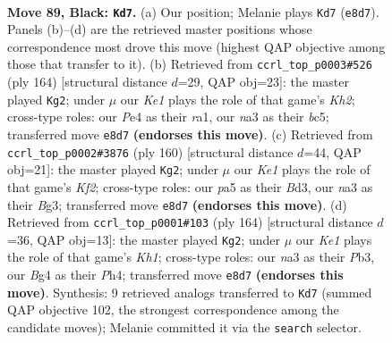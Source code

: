 \documentclass[11pt]{article}
\begin{document}
\clearpage

\begin{figure}[p]\centering
\begin{subfigure}{0.46\textwidth}\centering
\resizebox{\linewidth}{!}{%
\newchessgame
\chessboard[
  setfen={2n1k1K1/2P5/p7/P4p1p/4pBb1/Nr4P1/8/R7 b - - 85 89},
  showmover=false,
  pgfstyle=straightmove, color=movearrow, markmove={e8-d7}
]}
\caption{}
\end{subfigure}\hfill
\begin{subfigure}{0.46\textwidth}\centering
\resizebox{\linewidth}{!}{%
\newchessgame
\chessboard[
  setfen={8/7p/1p3k2/1BbR1p1P/P1P2P2/8/7K/r7 w - - 85 83},
  showmover=false,
  pgfstyle=straightmove, color=movearrow, markmove={h2-g2}
]}
\caption{}
\end{subfigure}
\\[4pt]
\begin{subfigure}{0.46\textwidth}\centering
\resizebox{\linewidth}{!}{%
\newchessgame
\chessboard[
  setfen={8/1b3k2/p5p1/P2P1pP1/1PP5/3B2Br/5K2/8 w - - 5 81},
  showmover=false,
  pgfstyle=straightmove, color=movearrow, markmove={f2-g2}
]}
\caption{}
\end{subfigure}\hfill
\begin{subfigure}{0.46\textwidth}\centering
\resizebox{\linewidth}{!}{%
\newchessgame
\chessboard[
  setfen={5k2/2b5/5p2/pR3B1p/P3P2P/1Pr5/8/7K w - - 1 83},
  showmover=false,
  pgfstyle=straightmove, color=movearrow, markmove={h1-g2}
]}
\caption{}
\end{subfigure}
\caption{\textbf{Move 89, Black: \texttt{Kd7}.} (a) Our position; Melanie plays \texttt{Kd7} (\texttt{e8d7}). Panels (b)--(d) are the retrieved master positions whose correspondence most drove this move (highest QAP objective among those that transfer to it). (b) Retrieved from \texttt{ccrl\_top\_p0003\#526} (ply 164) [structural distance $d$=29, QAP obj=23]: the master played \texttt{Kg2}; under $\mu$ our \emph{Ke1} plays the role of that game's \emph{Kh2}; cross-type roles: our \emph{P}e4 as their \emph{r}a1, our \emph{n}a3 as their \emph{b}c5; transferred move \texttt{e8d7} \textbf{(endorses this move)}. (c) Retrieved from \texttt{ccrl\_top\_p0002\#3876} (ply 160) [structural distance $d$=44, QAP obj=21]: the master played \texttt{Kg2}; under $\mu$ our \emph{Ke1} plays the role of that game's \emph{Kf2}; cross-type roles: our \emph{p}a5 as their \emph{B}d3, our \emph{n}a3 as their \emph{B}g3; transferred move \texttt{e8d7} \textbf{(endorses this move)}. (d) Retrieved from \texttt{ccrl\_top\_p0001\#103} (ply 164) [structural distance $d$=36, QAP obj=13]: the master played \texttt{Kg2}; under $\mu$ our \emph{Ke1} plays the role of that game's \emph{Kh1}; cross-type roles: our \emph{n}a3 as their \emph{P}b3, our \emph{B}g4 as their \emph{P}h4; transferred move \texttt{e8d7} \textbf{(endorses this move)}. Synthesis: 9 retrieved analogs transferred to \texttt{Kd7} (summed QAP objective 102, the strongest correspondence among the candidate moves); Melanie committed it via the \texttt{search} selector.}
\label{fig:thought-m177}
\end{figure}
\end{document}
